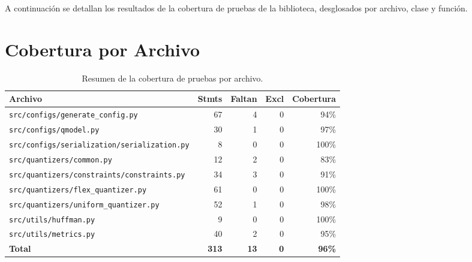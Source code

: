 \label{appendix:coverage}
\vspace{-0.5cm}
A continuación se detallan los resultados de la cobertura de pruebas de la biblioteca, desglosados por archivo, clase y función.
\section{Cobertura por Archivo}
\begin{table}[H]
\centering
\caption{Resumen de la cobertura de pruebas por archivo.}
\label{tab:coverage_file}
\scriptsize
\begin{tabularx}{\textwidth}{Xrrrr}
\toprule
\textbf{Archivo} & \textbf{Stmts} & \textbf{Faltan} & \textbf{Excl} & \textbf{Cobertura} \\
\midrule
\texttt{src/configs/generate\_config.py} & 67 & 4 & 0 & 94\% \\
\texttt{src/configs/qmodel.py} & 30 & 1 & 0 & 97\% \\
\texttt{src/configs/serialization/serialization.py} & 8 & 0 & 0 & 100\% \\
\texttt{src/quantizers/common.py} & 12 & 2 & 0 & 83\% \\
\texttt{src/quantizers/constraints/constraints.py} & 34 & 3 & 0 & 91\% \\
\texttt{src/quantizers/flex\_quantizer.py} & 61 & 0 & 0 & 100\% \\
\texttt{src/quantizers/uniform\_quantizer.py} & 52 & 1 & 0 & 98\% \\
\texttt{src/utils/huffman.py} & 9 & 0 & 0 & 100\% \\
\texttt{src/utils/metrics.py} & 40 & 2 & 0 & 95\% \\
\midrule
\textbf{Total} & \textbf{313} & \textbf{13} & \textbf{0} & \textbf{96\%} \\
\bottomrule
\end{tabularx}
\end{table}

